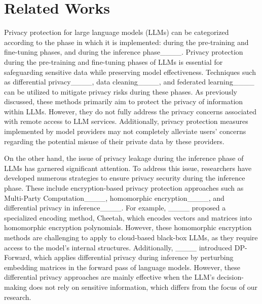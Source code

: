 \section{Related Works}
\label{sec:rel}

Privacy protection for large language models (LLMs) can be categorized according to the phase in which it is implemented: during the pre-training and fine-tuning phases, and during the inference phase____.
Privacy protection during the pre-training and fine-tuning phases of LLMs is essential for safeguarding sensitive data while preserving model effectiveness. 
Techniques such as differential privacy____, data cleaning____, and federated learning____ can be utilized to mitigate privacy risks during these phases.
As previously discussed, these methods primarily aim to protect the privacy of information within LLMs. However, they do not fully address the privacy concerns associated with remote access to LLM services. 
Additionally, privacy protection measures implemented by model providers may not completely alleviate users' concerns regarding the potential misuse of their private data by these providers.

On the other hand, the issue of privacy leakage during the inference phase of LLMs has garnered significant attention.
To address this issue, researchers have developed numerous strategies to ensure privacy security during the inference phase. 
These include encryption-based privacy protection approaches such as Multi-Party Computation____, homomorphic encryption____, and differential privacy in inference____.
%
For example, ____ proposed a specialized encoding method, Cheetah, which encodes vectors and matrices into homomorphic encryption polynomials.
However, these homomorphic encryption methods are challenging to apply to cloud-based black-box LLMs, as they require access to the model's internal structures.
%
Additionally, ____ introduced DP-Forward, which applies differential privacy during inference by perturbing embedding matrices in the forward pass of language models. 
However, these differential privacy approaches are mainly effective when the LLM’s decision-making does not rely on sensitive information, which differs from the focus of our research.


